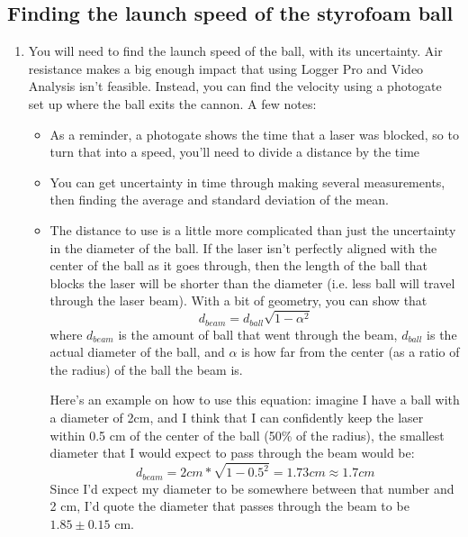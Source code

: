 \documentclass[twoside,11pt,ShortChapTitles]{BYUTextbook}
\begin{document}
\subsection{Finding the launch speed of the styrofoam ball}
\begin{enumerate}
\item You will need to find the launch speed of the ball, with its uncertainty. Air resistance makes a big enough impact that using Logger Pro and Video Analysis isn't feasible. Instead, you can find the velocity using a photogate set up where the ball exits the cannon. A few notes:
\begin{itemize}
\item As a reminder, a photogate shows the time that a laser was blocked, so to turn that into a speed, you'll need to divide a distance by the time

\item You can get uncertainty in time through making several measurements, then finding the average and standard deviation of the mean.

\item The distance to use is a little more complicated than just the uncertainty in the diameter of the ball. If the laser isn't perfectly aligned with the center of the ball as it goes through, then the length of the ball that blocks the laser will be shorter than the diameter (i.e. less ball will travel through the laser beam). With a bit of geometry, you can show that \[d_{beam} = d_{ball}\sqrt{1-\alpha^2}\] where $d_{beam}$ is the amount of ball that went through the beam, $d_{ball}$ is the actual diameter of the ball, and $\alpha$ is how far from the center (as a ratio of the radius) of the ball the beam is.

Here's an example on how to use this equation: imagine I have a ball with a diameter of 2cm, and I think that I can confidently keep the laser within 0.5 cm of the center of the ball (50\% of the radius), the smallest diameter that I would expect to pass through the beam would be: 
\[d_{beam} = 2cm * \sqrt{1-0.5^2} = 1.73  cm \approx 1.7 cm \]
Since I'd expect my diameter  to be somewhere between that number and 2 cm, I'd quote the diameter that passes through the beam to be $ 1.85 \pm 0.15$ cm.
\end{itemize}
\end{enumerate}
\end{document}
